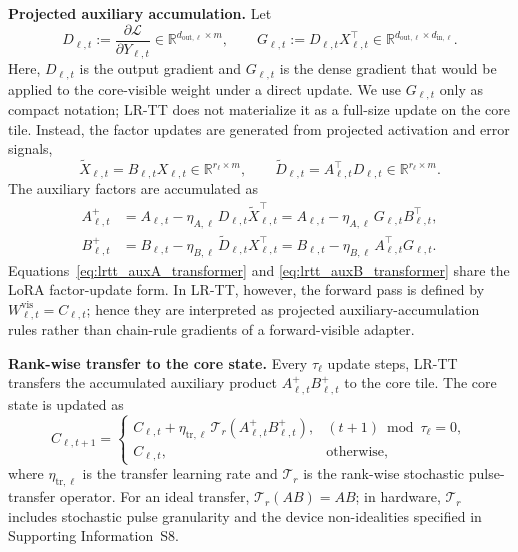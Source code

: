 \documentclass[AMA,LATO2COL]{WileyNJDv5}
\begin{document}
\noindent\textbf{Projected auxiliary accumulation.}
Let
\begin{equation}
D_{\ell,t}
:=
\frac{\partial \mathcal{L}}{\partial Y_{\ell,t}}
\in \mathbb{R}^{d_{\mathrm{out},\ell}\times m},
\qquad
G_{\ell,t}
:=
D_{\ell,t}X_{\ell,t}^{\top}
\in \mathbb{R}^{d_{\mathrm{out},\ell}\times d_{\mathrm{in},\ell}} .
\label{eq:lrtt_layer_grad}
\end{equation}
Here, \(D_{\ell,t}\) is the output gradient and \(G_{\ell,t}\) is the dense gradient that would be applied to the core-visible weight under a direct update.
We use \(G_{\ell,t}\) only as compact notation; LR-TT does not materialize it as a full-size update on the core tile.
Instead, the factor updates are generated from projected activation and error signals,
\begin{equation}
\widetilde{X}_{\ell,t}
=
B_{\ell,t}X_{\ell,t}
\in
\mathbb{R}^{r_\ell\times m},
\qquad
\widetilde{D}_{\ell,t}
=
A_{\ell,t}^{\top}D_{\ell,t}
\in
\mathbb{R}^{r_\ell\times m}.
\label{eq:lrtt_projected_signals}
\end{equation}
The auxiliary factors are accumulated as
\begin{align}
A_{\ell,t}^{+}
&=
A_{\ell,t}
-
\eta_{A,\ell}\,D_{\ell,t}\widetilde{X}_{\ell,t}^{\top}
=
A_{\ell,t}
-
\eta_{A,\ell}\,G_{\ell,t}B_{\ell,t}^{\top},
\label{eq:lrtt_auxA_transformer}
\\
B_{\ell,t}^{+}
&=
B_{\ell,t}
-
\eta_{B,\ell}\,\widetilde{D}_{\ell,t}X_{\ell,t}^{\top}
=
B_{\ell,t}
-
\eta_{B,\ell}\,A_{\ell,t}^{\top}G_{\ell,t}.
\label{eq:lrtt_auxB_transformer}
\end{align}
Equations~\eqref{eq:lrtt_auxA_transformer} and \eqref{eq:lrtt_auxB_transformer} share the LoRA factor-update form.
In LR-TT, however, the forward pass is defined by \(W^{\mathrm{vis}}_{\ell,t}=C_{\ell,t}\); hence they are interpreted as projected auxiliary-accumulation rules rather than chain-rule gradients of a forward-visible adapter.


\noindent\textbf{Rank-wise transfer to the core state.}
Every \(\tau_\ell\) update steps, LR-TT transfers the accumulated auxiliary product \(A_{\ell,t}^{+}B_{\ell,t}^{+}\) to the core tile.
The core state is updated as
\begin{equation}
C_{\ell,t+1}
=
\begin{cases}
C_{\ell,t}
+
\eta_{\mathrm{tr},\ell}\,
\mathcal{T}_{r}\!\left(A_{\ell,t}^{+}B_{\ell,t}^{+}\right),
& (t+1)\bmod \tau_\ell=0,\\[4pt]
C_{\ell,t},
& \mathrm{otherwise},
\end{cases}
\label{eq:lrtt_transformer_transfer}
\end{equation}
where \(\eta_{\mathrm{tr},\ell}\) is the transfer learning rate and \(\mathcal{T}_{r}\) is the rank-wise stochastic pulse-transfer operator.
For an ideal transfer, \(\mathcal{T}_{r}(AB)=AB\); in hardware, \(\mathcal{T}_{r}\) includes stochastic pulse granularity and the device non-idealities specified in Supporting Information~S8.
\end{document}
